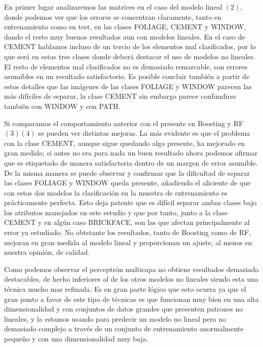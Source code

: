 \documentclass{article}
\begin{document}
	En primer lugar analizaremos las matrices en el caso del modelo lineal $(2)$, donde podemos ver que los errores se concentran claramente, tanto en entrenamiento como en test, en las clases FOLIAGE, CEMENT y WINDOW, dando el resto muy buenos resultados aun con modelos lineales. En el caso de CEMENT hablamos incluso de un tercio de los elementos mal clasificados, por lo que será en estas tres clases donde deberá destacar el uso de modelos no lineales. El resto de elementos mal clasificados no es demasiado remarcable, son errores asumibles en un resultado satisfactorio. Es posible concluir también a partir de estos detalles que las imágenes de las clases FOLIAGE y WINDOW parecen las más difíciles de separar, la clase CEMENT sin embargo parece confundirse también con WINDOW y con PATH.
	\par 
	Si comparamos el comportamiento anterior con el presente en Boosting y RF $(3)(4)$ se pueden ver distintas mejoras. La más evidente es que el problema con la clase CEMENT, aunque sigue quedando algo presente, ha mejorado en gran medida; si antes no era para nada un buen resultado ahora podemos afirmar que es etiquetado de manera satisfactoria dentro de un margen de error asumible. De la misma manera se puede observar y confirmar que la dificultad de separar las clases FOLIAGE y WINDOW queda presente, añadiendo el aliciente de que con estos dos modelos la clasificación en la muestra de entrenamiento es prácticamente perfecta. Esto deja patente que es difícil separar ambas clases bajo los atributos manejados en este estudio y que por tanto, junto a la clase CEMENT y en algún caso BRICKFACE, son las que afectan principalmente al error ya estudiado. No obtstante los resultados, tanto de Boosting como de RF, mejoran en gran medida al modelo lineal y proporcionan un ajuste, al menos en nuestra opinión, de calidad.
	\par
	Como podemos observar el perceptrón multicapa no obtiene resultados demasiado destacables, de hecho inferiores al de los otros modelos no lineales siendo esta una técnica mucho mas refinada. Es en gran parte lógico que esto ocurra ya que el gran punto a favor de este tipo de técnicas es que funcionan muy bien en una alta dimensionalidad y con conjuntos de datos grandes que presenten patrones no lineales, y la estamos usando para predecir un modelo no lineal pero no demasiado complejo a través de un conjunto de entrenamiento anormalmente pequeño y con una dimensionalidad muy baja.
	
\end{document}
